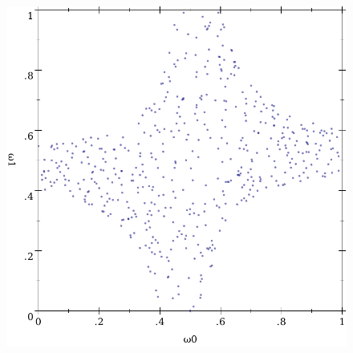 \begin{figure}[tb!]
{\includegraphics[width=\subfigurewidth]{results/mul-preimage-points}%
}


\end{figure}
